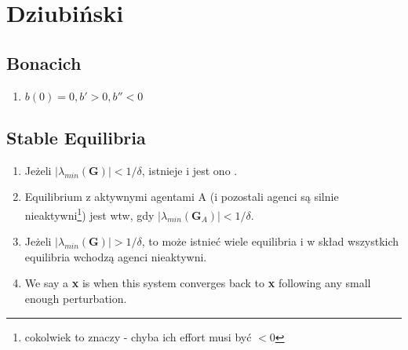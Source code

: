 \section{Dziubiński}

\subsection{Bonacich}


\begin{enumerate}
  \item
    $
    b(0) = 0,
    b' > 0,
    b'' < 0
    $


\end{enumerate}

\subsection{Stable Equilibria}

\begin{enumerate}
 \item Jeżeli $|\lambda_{min}(\textbf{G})| < 1/\delta$, istnieje  i jest ono .
 \item Equilibrium z aktywnymi agentami A (i pozostali agenci są silnie nieaktywni\footnote{cokolwiek to znaczy - chyba ich effort musi być $< 0$}) jest  wtw, gdy  $|\lambda_{min}(\textbf{G}_{A})| < 1/\delta$.
 \item Jeżeli $|\lambda_{min}(\textbf{G})| > 1/\delta$, to może istnieć wiele equilibria i w skład wszystkich equilibria wchodzą agenci nieaktywni.
 \item We say a  \textbf{x} is  when this system converges back to \textbf{x} following any small enough perturbation.
\end{enumerate}

